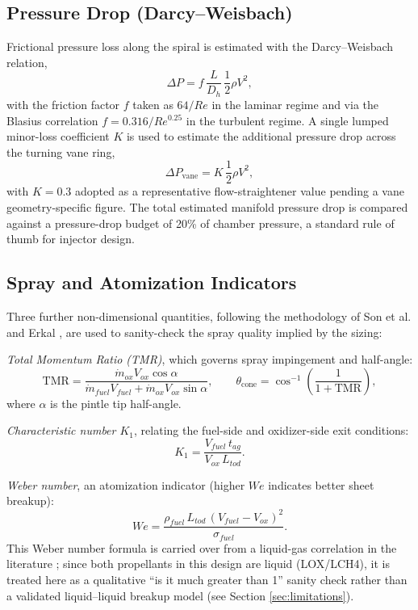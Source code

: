 \documentclass[11pt,a4paper]{article}
\begin{document}
\subsection{Pressure Drop (Darcy--Weisbach)}

Frictional pressure loss along the spiral is estimated with the Darcy--Weisbach relation,
\begin{equation}
\Delta P = f\,\frac{L}{D_h}\,\frac{1}{2}\rho V^2,
\end{equation}
with the friction factor $f$ taken as $64/Re$ in the laminar regime and via the Blasius correlation $f = 0.316/Re^{0.25}$ in the turbulent regime. A single lumped minor-loss coefficient $K$ is used to estimate the additional pressure drop across the turning vane ring,
\begin{equation}
\Delta P_{\text{vane}} = K\,\frac{1}{2}\rho V^2,
\end{equation}
with $K = 0.3$ adopted as a representative flow-straightener value pending a vane geometry-specific figure. The total estimated manifold pressure drop is compared against a pressure-drop budget of 20\% of chamber pressure, a standard rule of thumb for injector design.

\subsection{Spray and Atomization Indicators}

Three further non-dimensional quantities, following the methodology of Son et al. \cite{son2017} and Erkal \cite{erkal2019}, are used to sanity-check the spray quality implied by the sizing:

\emph{Total Momentum Ratio (TMR)}, which governs spray impingement and half-angle:
\begin{equation}
\text{TMR} = \frac{\dot{m}_{ox} V_{ox} \cos\alpha}{\dot{m}_{fuel} V_{fuel} + \dot{m}_{ox} V_{ox} \sin\alpha}, \qquad
\theta_{\text{cone}} = \cos^{-1}\!\left(\frac{1}{1+\text{TMR}}\right),
\end{equation}
where $\alpha$ is the pintle tip half-angle.

\emph{Characteristic number $K_1$}, relating the fuel-side and oxidizer-side exit conditions:
\begin{equation}
K_1 = \frac{V_{fuel}\, t_{ag}}{V_{ox}\, L_{tod}}.
\end{equation}

\emph{Weber number}, an atomization indicator (higher $We$ indicates better sheet breakup):
\begin{equation}
We = \frac{\rho_{fuel}\, L_{tod}\,(V_{fuel}-V_{ox})^2}{\sigma_{fuel}}.
\end{equation}
This Weber number formula is carried over from a liquid-gas correlation in the literature \cite{erkal2019}; since both propellants in this design are liquid (LOX/LCH4), it is treated here as a qualitative ``is it much greater than 1'' sanity check rather than a validated liquid--liquid breakup model (see Section \ref{sec:limitations}).
\end{document}
